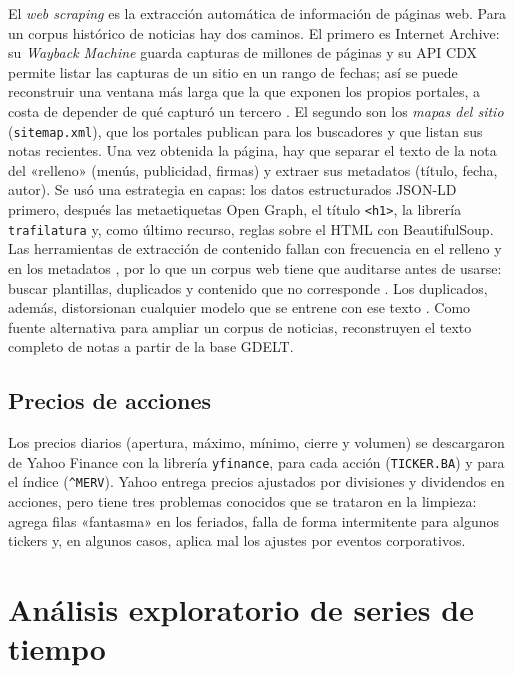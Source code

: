 El \textit{web scraping} es la extracción automática de información de páginas web. Para un
corpus histórico de noticias hay dos caminos. El primero es Internet Archive: su
\textit{Wayback Machine} guarda capturas de millones de páginas y su API CDX permite listar
las capturas de un sitio en un rango de fechas; así se puede reconstruir una ventana más larga
que la que exponen los propios portales, a costa de depender de qué capturó un tercero
\citep{garg2025wayback}. El segundo son los \textit{mapas del sitio} (\texttt{sitemap.xml}),
que los portales publican para los buscadores y que listan sus notas recientes. Una vez
obtenida la página, hay que separar el texto de la nota del «relleno» (menús, publicidad,
firmas) y extraer sus metadatos (título, fecha, autor). Se usó una estrategia en capas: los
datos estructurados JSON-LD primero, después las metaetiquetas Open Graph, el título
\texttt{<h1>}, la librería \texttt{trafilatura} \citep{barbaresi2021} y, como último recurso,
reglas sobre el HTML con BeautifulSoup. Las herramientas de extracción de contenido fallan con
frecuencia en el relleno y en los metadatos \citep{foley2026wcxb,hatwar2024author}, por lo
que un corpus web tiene que auditarse antes de usarse: buscar plantillas, duplicados y
contenido que no corresponde \citep{dodge2021c4}. Los duplicados, además, distorsionan
cualquier modelo que se entrene con ese texto \citep{lee2021dedup}. Como fuente alternativa
para ampliar un corpus de noticias, \citet{fronzetti2026gdelt} reconstruyen el texto completo
de notas a partir de la base GDELT.

\subsection{Precios de acciones}

Los precios diarios (apertura, máximo, mínimo, cierre y volumen) se descargaron de Yahoo
Finance con la librería \texttt{yfinance}, para cada acción (\texttt{TICKER.BA}) y para el
índice (\texttt{\^{}MERV}). Yahoo entrega precios ajustados por divisiones y dividendos en
acciones, pero tiene tres problemas conocidos que se trataron en la limpieza: agrega filas
«fantasma» en los feriados, falla de forma intermitente para algunos tickers y, en algunos
casos, aplica mal los ajustes por eventos corporativos.

\section{Análisis exploratorio de series de tiempo}
\label{sec:tec-eda}

